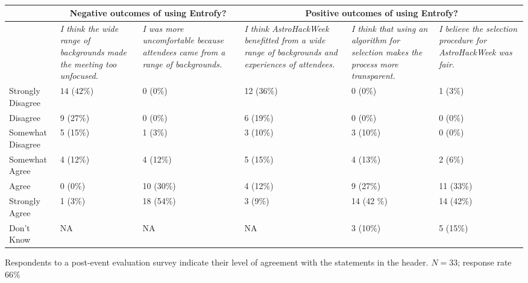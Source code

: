 \documentclass[10pt,letterpaper]{article}
\begin{document}
\begin{table}
\renewcommand{\arraystretch}{1.3}
\footnotesize
\caption{}
\begin{threeparttable} 
\begin{tabularx}{22cm}{p{2cm}p{3.5cm}p{3.5cm}p{0.5cm}p{3.5cm}p{3.5cm}p{3.5cm}}
\toprule
 & \multicolumn{3}{c}{Negative outcomes of using Entrofy?} & \multicolumn{3}{c}{Positive outcomes of using Entrofy?} \\
 \midrule
 & \textit{I think the wide range of backgrounds made the meeting too unfocused.} & \textit{I was more uncomfortable because attendees came from a range of backgrounds.} && \textit{I think AstroHackWeek benefitted from a wide range of backgrounds and experiences of attendees.} & \textit{I think that using an algorithm for selection makes the process more transparent.} & \textit{I believe the selection procedure for AstroHackWeek was fair.} \\
 \midrule
 Strongly Disagree & $14$ ($42\%$) & 0 (0\%) && 12 (36\%) & 0 (0\%) & 1 (3\%) \\
 Disagree & 9 (27\%) & 0 (0\%) && 6 (19\%) & 0 (0\%) & 0 (0\%) \\
 Somewhat Disagree & 5 (15\%) & 1 (3\%) && 3 (10\%) & 3 (10\%) & 0 (0\%) \\
 Somewhat Agree & 4 (12\%) & 4 (12\%) && 5 (15\%) & 4 (13\%) & 2 (6\%) \\
 Agree & 0 (0\%) & 10 (30\%) && 4 (12\%) & 9 (27\%) & 11 (33\%) \\
 Strongly Agree & 1 (3\%) & 18 (54\%) && 3 (9\%) & 14 (42 \%) & 14 (42\%) \\
 Don't Know & NA & NA && NA & 3 (10\%) & 5 (15\%) \\
\bottomrule
\end{tabularx}
   \begin{tablenotes}
      \item{Respondents to a post-event evaluation survey indicate their level of agreement with the statements in the header. $N=33$; response rate $66\%$}
\end{tablenotes}

\end{threeparttable}
\label{tab:outcomes}
\end{table}
\end{document}
